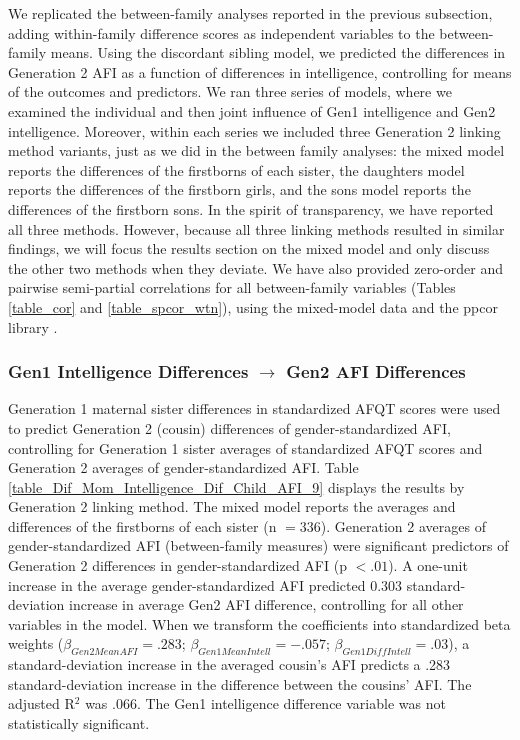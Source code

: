 We replicated the between-family analyses reported in the previous subsection, adding within-family difference scores as independent variables to the between-family means. Using the discordant sibling model, we predicted the differences in Generation 2 AFI as a function of differences in intelligence, controlling for means of the outcomes and predictors. We ran three series of models, where we examined the individual and then joint influence of Gen1 intelligence and Gen2 intelligence. Moreover, within each series we included three Generation 2 linking method variants, just as we did in the between family analyses: the mixed model reports the differences of the firstborns of each sister, the daughters model reports the differences of the firstborn girls, and the sons model reports the differences of the firstborn sons. In the spirit of transparency, we have reported all three methods. However, because all three linking methods resulted in similar findings, we will focus the results section on the mixed model and only discuss the other two methods when they deviate. We have also provided zero-order and pairwise semi-partial correlations for all between-family variables (Tables \ref{table_cor} and \ref{table_spcor_wtn}), using the mixed-model data and the ppcor \R library \citep{kim2015ppcor}.


\subsubsection{Gen1 Intelligence Differences $\rightarrow$ Gen2 AFI Differences} 
Generation 1 maternal sister differences in standardized AFQT scores were used to predict Generation 2 (cousin) differences of gender-standardized AFI, controlling for Generation 1 sister averages of standardized AFQT scores and Generation 2 averages of gender-standardized AFI. Table \ref{table_Dif_Mom_Intelligence_Dif_Child_AFI_9} displays the results by Generation 2 linking method. The mixed model reports the averages and differences of the firstborns of each sister (n $= 336$). Generation 2 averages of gender-standardized AFI (between-family measures) were significant predictors of Generation 2 differences in gender-standardized AFI (p $< .01$). A one-unit increase in the average gender-standardized AFI predicted $0.303$ standard-deviation increase in average Gen2 AFI difference, controlling for all other variables in the model. When we transform the coefficients into standardized beta weights ($\beta_{Gen2 Mean AFI} = .283$; $\beta_{Gen1 Mean Intell} = -.057$; $\beta_{Gen1 Diff Intell} = .03$), a standard-deviation increase in the averaged cousin's AFI predicts a .283 standard-deviation increase in the difference between the cousins' AFI. The adjusted R$^{2}$ was .066. The Gen1 intelligence difference variable was not statistically significant.

